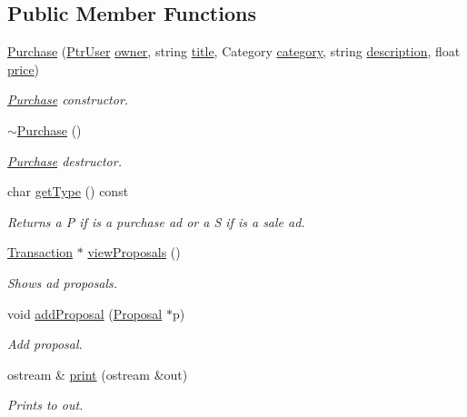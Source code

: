 \subsection*{Public Member Functions}
\begin{DoxyCompactItemize}
\item 
\hyperlink{class_purchase_a205b0e7ff255956bbc5aaca2403dc007}{Purchase} (\hyperlink{class_ptr_user}{Ptr\+User} \hyperlink{class_advertisement_abcb6446847bfd1880be9c854c4442313}{owner}, string \hyperlink{class_advertisement_a63b197da6f91139ed6baf700f834a3db}{title}, Category \hyperlink{class_advertisement_af77599e289974c0e4f502db621257fe5}{category}, string \hyperlink{class_advertisement_afb0909f9fceabb44804e06e721ff7fee}{description}, float \hyperlink{class_advertisement_aefd1dddaabd0cfa411e6cbaaf67c4dd5}{price})
\begin{DoxyCompactList}\small\item\em \hyperlink{class_purchase}{Purchase} constructor. \end{DoxyCompactList}\item 
\hypertarget{class_purchase_a8ebd6efb2177df6d10fcba514095915f}{}\hyperlink{class_purchase_a8ebd6efb2177df6d10fcba514095915f}{$\sim$\+Purchase} ()\label{class_purchase_a8ebd6efb2177df6d10fcba514095915f}

\begin{DoxyCompactList}\small\item\em \hyperlink{class_purchase}{Purchase} destructor. \end{DoxyCompactList}\item 
char \hyperlink{class_purchase_aacd849fc1ec2b96e7c59de4012b8e45a}{get\+Type} () const 
\begin{DoxyCompactList}\small\item\em Returns a P if is a purchase ad or a S if is a sale ad. \end{DoxyCompactList}\item 
\hypertarget{class_purchase_aceac950ad211470727c2cbcfe11eb69a}{}\hyperlink{class_transaction}{Transaction} $\ast$ \hyperlink{class_purchase_aceac950ad211470727c2cbcfe11eb69a}{view\+Proposals} ()\label{class_purchase_aceac950ad211470727c2cbcfe11eb69a}

\begin{DoxyCompactList}\small\item\em Shows ad proposals. \end{DoxyCompactList}\item 
void \hyperlink{class_purchase_aba6c84c5e90bdff8aac40704ec92c716}{add\+Proposal} (\hyperlink{class_proposal}{Proposal} $\ast$p)
\begin{DoxyCompactList}\small\item\em Add proposal. \end{DoxyCompactList}\item 
ostream \& \hyperlink{class_purchase_ad9c91fe1eadbb43884d5e95fb9607b08}{print} (ostream \&out)
\begin{DoxyCompactList}\small\item\em Prints to out. \end{DoxyCompactList}\end{DoxyCompactItemize}
